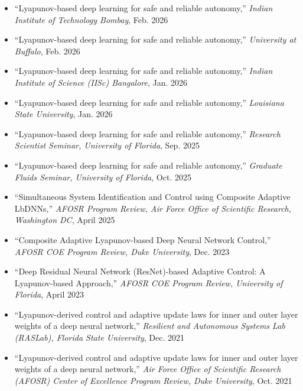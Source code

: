 \documentclass[10pt, letterpaper]{article}
\begin{document}
\begin{itemize}

\item{``Lyapunov-based deep learning for safe and reliable autonomy,'' \textit{Indian Institute of Technology Bombay}, Feb. 2026}

\item{``Lyapunov-based deep learning for safe and reliable autonomy,'' \textit{University at Buffalo}, Feb. 2026}

\item{``Lyapunov-based deep learning for safe and reliable autonomy,'' \textit{Indian Institute of Science (IISc) Bangalore}, Jan. 2026}

\item{``Lyapunov-based deep learning for safe and reliable autonomy,'' \textit{Louisiana State University}, Jan. 2026}

\item{``Lyapunov-based deep learning for safe and reliable autonomy,'' \textit{Research Scientist Seminar, University of Florida}, Sep. 2025}

\item{``Lyapunov-based deep learning for safe and reliable autonomy,'' \textit{Graduate Fluids Seminar, University of Florida}, Oct. 2025}

\item{``Simultaneous System Identification and Control using Composite Adaptive LbDNNs,'' \textit{AFOSR Program Review, Air Force Office of Scientific Research, Washington DC}, April 2025}

\item{``Composite Adaptive Lyapunov-based Deep Neural Network Control,'' \textit{AFOSR COE Program Review, Duke University}, Dec. 2023}

\item{``Deep Residual Neural Network (ResNet)-based Adaptive Control: A Lyapunov-based Approach,'' \textit{AFOSR COE Program Review, University of Florida}, April 2023}

\item{``Lyapunov-derived control and adaptive update laws for inner and outer layer weights of a deep neural network,'' \textit{Resilient and Autonomous Systems Lab (RASLab), Florida State University}, Dec. 2021}

\item{``Lyapunov-derived control and adaptive update laws for inner and outer layer weights of a deep neural network,'' \textit{Air Force Office of Scientific Research (AFOSR) Center of Excellence Program Review, Duke University}, Oct. 2021}


\end{itemize}
\end{document}
